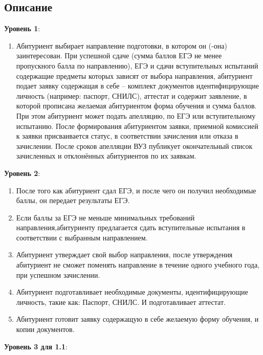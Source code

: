 \documentclass[areasetadvanced]{scrartcl}
\begin{document}
\subsection{Описание}
\textbf{Уровень 1}:
\begin{enumerate}
    \item Абитуриент выбирает направление подготовки, в котором он (-она) заинтересован. При успешной сдаче (сумма баллов ЕГЭ не менее пропускного балла по направлению), ЕГЭ и сдачи вступительных испытаний содержащие предметы которых зависят от выбора направления, абитуриент подает заявку содержащая в себе – комплект документов идентифицирующие личность (например: паспорт, СНИЛС), аттестат и содержит заявление, в которой прописана желаемая абитуриентом форма обучения и сумма баллов. При этом абитуриент может подать апелляцию, по ЕГЭ или вступительному испытанию. После формирования абитуриентом заявки, приемной комиссией к заявки присваивается статус, в соответствии зачисления или отказа в зачислении. После сроков апелляции ВУЗ публикует окончательный список зачисленных и отклонённых абитуриентов по их заявкам.
\end{enumerate}
\textbf{Уровень 2}:
\begin{enumerate}
    \item После того как абитуриент сдал ЕГЭ, и после чего он получил необходимые баллы, он передает результаты ЕГЭ.
    \item Если баллы за ЕГЭ не меньше минимальных требований направления,абитуриенту предлагается сдать вступительные испытания в соответствии с выбранным направлением.
    \item Абитуриент утверждает свой выбор направления, после утверждения абитуриент не сможет поменять направление в течение одного учебного года, при успешном зачислении.
    \item Абитуриент подготавливает необходимые документы, идентифицирующие личность, такие как: Паспорт, СНИЛС. И подготавливает аттестат.
    \item Абитуриент готовит заявку содержащую в себе желаемую форму обучения, и копии документов.
\end{enumerate}
\textbf{Уровень 3 для 1.1}:
\end{document}
